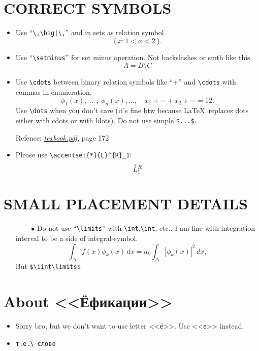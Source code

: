 \documentclass[a5paper,openany,9pt]{extbook}
\begin{document}
\section{CORRECT SYMBOLS}

\begin{itemize}
\item
Use ``\verb=\,\big|\,='' and in sets as relation symbol
$$\{\,x : 1 < x < 2\,\}.$$
\item
Use ``\verb=\setminus='' for set minus operation. Not backslashes or smth like this.
$$
A = B \setminus C
$$
\item 
Use \verb|\cdots| between binary relation symbols like ``+'' and \verb|\cdots| with commas in enumeration.
$$
\phi_1(x),\ \ldots\,,\ \phi_n(x), \ldots,\quad x_1 + \cdots + x_2 + \cdots = 12.
$$
Use \verb|\dots| when you don't care (it's fine btw because \LaTeX\ replaces dots either with cdots or with ldots). Do not use simple \verb|$...$|.

Refence: \href{http://www.ctex.org/documents/shredder/src/texbook.pdf}{\textit{texbook.pdf}}, page 172
\item 
Please use \verb=\accentset{*}{L}^{R}_1=:
$$
\accentset{*}{L}^{R}_1
$$
\end{itemize}
\section{SMALL PLACEMENT DETAILS}
\begin{itemize}
\item[\colorbox{prpl}{\textcolor{white}{MY}}\ $\bullet$]
Do not use ``\verb=\limits='' with \verb=\int=,\verb=\int=, etc.. I am fine with integration interval to be a side of integral-symbol.
$$
\int_\Delta{f(x) \phi_k(x)}\,dx=a_k\int_\Delta|\phi_k(x)|^2\,dx,
$$
But \verb=$\iint\limits$=
\end{itemize}

\section{About <<Ёфикации>>}
\begin{itemize}
\item
Sorry bro, but we don't want to use letter <<ё>>. Use <<е>> instead.
\item 
\verb=т.е.\ слово=
\end{itemize}




\newpage
\end{document}
